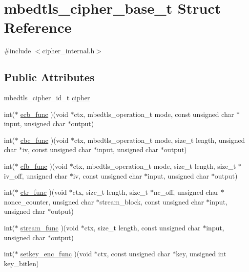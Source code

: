 \hypertarget{structmbedtls__cipher__base__t}{}\section{mbedtls\+\_\+cipher\+\_\+base\+\_\+t Struct Reference}
\label{structmbedtls__cipher__base__t}


{\ttfamily \#include $<$cipher\+\_\+internal.\+h$>$}

\subsection*{Public Attributes}
\begin{DoxyCompactItemize}
\item 
mbedtls\+\_\+cipher\+\_\+id\+\_\+t \mbox{\hyperlink{structmbedtls__cipher__base__t_a0c4c819c23b0a579445f92a4bee7d577}{cipher}}
\item 
int($\ast$ \mbox{\hyperlink{structmbedtls__cipher__base__t_ab57bc9b81dd43b63915b37ab56b0468d}{ecb\+\_\+func}} )(void $\ast$ctx, mbedtls\+\_\+operation\+\_\+t mode, const unsigned char $\ast$input, unsigned char $\ast$output)
\item 
int($\ast$ \mbox{\hyperlink{structmbedtls__cipher__base__t_a205924b0ffe7b35d4b74a7a4c6675ddf}{cbc\+\_\+func}} )(void $\ast$ctx, mbedtls\+\_\+operation\+\_\+t mode, size\+\_\+t length, unsigned char $\ast$iv, const unsigned char $\ast$input, unsigned char $\ast$output)
\item 
int($\ast$ \mbox{\hyperlink{structmbedtls__cipher__base__t_a06361a67ea8a128d3a58b4f99ee6cf5f}{cfb\+\_\+func}} )(void $\ast$ctx, mbedtls\+\_\+operation\+\_\+t mode, size\+\_\+t length, size\+\_\+t $\ast$iv\+\_\+off, unsigned char $\ast$iv, const unsigned char $\ast$input, unsigned char $\ast$output)
\item 
int($\ast$ \mbox{\hyperlink{structmbedtls__cipher__base__t_ac3d68fe4b133c56acb5b05029b8f60ea}{ctr\+\_\+func}} )(void $\ast$ctx, size\+\_\+t length, size\+\_\+t $\ast$nc\+\_\+off, unsigned char $\ast$nonce\+\_\+counter, unsigned char $\ast$stream\+\_\+block, const unsigned char $\ast$input, unsigned char $\ast$output)
\item 
int($\ast$ \mbox{\hyperlink{structmbedtls__cipher__base__t_a52099766d7c09f16e702d78b6819d9e9}{stream\+\_\+func}} )(void $\ast$ctx, size\+\_\+t length, const unsigned char $\ast$input, unsigned char $\ast$output)
\item 
int($\ast$ \mbox{\hyperlink{structmbedtls__cipher__base__t_a775aad5b31782d29bb0fd9414c366a6a}{setkey\+\_\+enc\+\_\+func}} )(void $\ast$ctx, const unsigned char $\ast$key, unsigned int key\+\_\+bitlen)

\end{DoxyCompactItemize}
